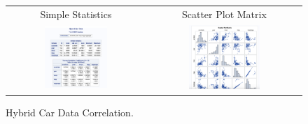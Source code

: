 \documentclass[acmsmall]{acmart}
\begin{document}
\begin{figure}[H] %
	\centering
	\begin{tabular}{p{} p{}}
	\hline
	\multicolumn{1}{|c|}{Simple Statistics} & \multicolumn{1}{|c|}{Scatter Plot Matrix} \\
		\multicolumn{1}{|c|}{\includegraphics[width=0.48\textwidth]{../graphics/PearsonVariables1}} &
		\multicolumn{1}{|c|}{\includegraphics[width=0.48\textwidth]{../graphics/PearsonVariables2}}\\
		\hline
	\end{tabular}		
	\caption{Hybrid Car Data Correlation.} %
	\label{fig:HCDPC}
\end{figure}
\end{document}
